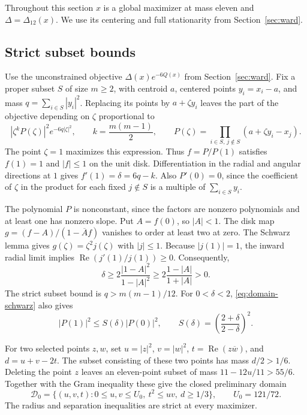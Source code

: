 \documentclass[11pt,letterpaper]{article}
\theoremstyle{remark}
\newcommand{\RePart}{\operatorname{Re}}
\begin{document}
Throughout this section \(x\) is a global maximizer at mass eleven and
\(\Delta=\Delta_{12}(x)\). We use its centering and full stationarity from
Section~\ref{sec:ward}.

\subsection{Strict subset bounds}

Use the unconstrained objective \(\Delta(x)e^{-6Q(x)}\) from
Section~\ref{sec:ward}. Fix a proper subset \(S\) of size
\(m\ge2\), with centroid \(a\), centered points \(y_i=x_i-a\), and mass
\(q=\sum_{i\in S}|y_i|^2\). Replacing its points by \(a+\zeta y_i\) leaves
the part of the objective depending on \(\zeta\) proportional to
\[
 |\zeta^k P(\zeta)|^2e^{-6q|\zeta|^2},\qquad
 k=\frac{m(m-1)}2,\qquad
 P(\zeta)=\prod_{i\in S,\,j\notin S}(a+\zeta y_i-x_j).
\]
The point \(\zeta=1\) maximizes this expression. Thus \(f=P/P(1)\) satisfies
\(f(1)=1\) and \(|f|\le1\) on the unit disk. Differentiation in the radial
and angular directions at \(1\) gives \(f'(1)=\delta=6q-k\). Also
\(P'(0)=0\), since the coefficient of \(\zeta\) in the product for each
fixed \(j\notin S\) is a multiple of \(\sum_{i\in S}y_i\).

The polynomial \(P\) is nonconstant, since the factors are nonzero
polynomials and at least one has nonzero slope. Put \(A=f(0)\), so
\(|A|<1\). The disk map \(g=(f-A)/(1-\overline A f)\) vanishes to order
at least two at zero. The Schwarz lemma gives \(g(\zeta)=\zeta^2 j(\zeta)\)
with \(|j|\le1\). Because \(|j(1)|=1\), the inward radial limit implies
\(\RePart(j'(1)/j(1))\ge0\). Consequently,
\begin{equation}
 \delta\ge 2\frac{|1-A|^2}{1-|A|^2}
 \ge 2\frac{1-|A|}{1+|A|}>0.
 \label{eq:domain-schwarz}
\end{equation}
The strict subset bound is \(q>m(m-1)/12\). For \(0<\delta<2\),
\eqref{eq:domain-schwarz} also gives
\begin{equation}
 |P(1)|^2\le S(\delta)|P(0)|^2,\qquad
 S(\delta)=\left(\frac{2+\delta}{2-\delta}\right)^2.
 \label{eq:domain-cross-factor}
\end{equation}

For two selected points \(z,w\), set
\(u=|z|^2\), \(v=|w|^2\), \(t=\RePart(z\overline w)\), and \(d=u+v-2t\).
The subset consisting of these two points has mass \(d/2>1/6\).
Deleting the point \(z\) leaves an eleven-point subset of mass
\(11-12u/11>55/6\). Together with the Gram inequality these give the
closed preliminary domain
\begin{equation}
 \mathcal D_0=\{(u,v,t):0\le u,v\le U_0,\ t^2\le uv,\ d\ge1/3\},
 \qquad U_0=121/72.
 \label{eq:domain-preliminary}
\end{equation}
The radius and separation inequalities are strict at every maximizer.
\end{document}
